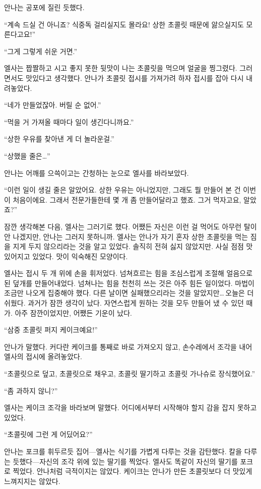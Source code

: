 안나는 공포에 질린 듯했다.

``계속 드실 건 아니죠? 식중독 걸리실지도 몰라요! 상한 초콜릿 때문에 앓으실지도 모른다고요!''

``그게 그렇게 쉬운 거면.''

엘사는 짭짤하고 시고 좋지 못한 뒷맛이 나는 초콜릿을 먹으며 얼굴을 찡그렸다. 그러면서도 맛있다고 생각했다. 안나가 초콜릿 접시를 가져가려 하자 접시를 잡아 다시 내려놓았다.

``네가 만들었잖아. 버릴 순 없어.''

``먹을 거 가져올 때마다 일이 생긴다니까요.''

``상한 우유를 찾아낸 게 더 놀라운걸.''

``상했을 줄은\ldots''

안나는 어깨를 으쓱이고는 간청하는 눈으로 엘사를 바라보았다.

``이런 일이 생길 줄은 알았어요. 상한 우유는 아니었지만, 그래도 뭘 만들어 본 건 이번이 처음이에요. 그래서 전문가들한테 몇 개 좀 만들어달라고 했죠. 그거 먹자고요, 알았죠?''

잠깐 생각해본 다음, 엘사는 그러기로 했다. 어쨌든 자신은 이런 걸 먹어도 아무런 탈이 안 나겠지만, 안나는 그러지 못하니까. 엘사는 안나가 자기 혼자 상한 초콜릿을 먹는 짐을 지게 두지 않으리라는 것을 알고 있었다. 솔직히 전혀 싫지 않았지만. 사실 점점 맛있어지고 있었다. 맛이 익숙해진 모양이다.

엘사는 접시 두 개 위에 손을 휘저었다. 넘쳐흐르는 힘을 조심스럽게 조절해 얼음으로 된 덮개를 만들어내었다. 넘쳐나는 힘을 천천히 쓰는 것은 아주 힘든 일이었다. 마법이 조금만 나오게 집중해야 했다. 다른 날이면 실패했으리라는 것을 알았지만\ldots\,오늘은 더 쉬웠다. 과거가 잠깐 생각이 났다. 자연스럽게 원하는 것을 모두 만들어 냈 수 있던 때가. 아주 잠깐이었지만, 어쨌든 기운이 났다.

``삼중 초콜릿 퍼지 케이크예요!''

안나가 말했다. 커다란 케이크를 통째로 바로 가져오지 않고, 손수레에서 조각을 내어 엘사의 접시에 올려놓았다.

``초콜릿으로 덮고, 초콜릿으로 채우고, 초콜릿 딸기하고 초콜릿 가나슈로 장식했어요.''

``좀 과하지 않니?''

엘사는 케이크 조각을 바라보며 말했다. 어디에서부터 시작해야 할지 감을 잡지 못하고 있었다.

``초콜릿에 그런 게 어딨어요?''

안나는 포크를 휘두르듯 집어—엘사는 식기를 가볍게 다루는 것을 감탄했다. 칼을 다루는 듯했다—자신의 조각 위에 있는 딸기를 찍었다. 엘사도 똑같이 자신의 딸기를 포크로 찍었다. 안나처럼 극적이지는 않았다. 케이크는 안나가 만든 초콜릿보다 더 맛있게 느껴지지는 않았다.

